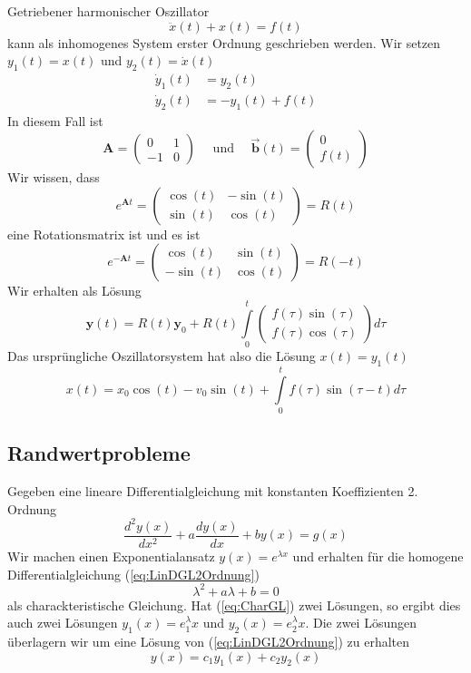    \begin{example}{Getriebener harmonischer Oszillator}
     \[\ddot{x}(t)+x(t)=f(t)\]
     kann als inhomogenes System erster Ordnung geschrieben werden. Wir setzen
     $y_1(t)=x(t)$ und $y_2(t)=\dot{x}(t)$
     \begin{align*}
       \dot{y}_1(t)&=y_2(t)\\
       \dot{y}_2(t)&=-y_1(t)+f(t)
     \end{align*}
     In diesem Fall ist
     \[\mathbf{A}=
       \begin{pmatrix}
	 0&1\\ -1&0
       \end{pmatrix}\quad
       \mbox{ und }\quad
       \vec{\mathbf{b}}(t)=\begin{pmatrix}0\\ f(t)\end{pmatrix}
     \]
     Wir wissen, dass
     \[e^{\mathbf{A}t}=
       \begin{pmatrix}
	 \cos(t)&-\sin(t)\\ \sin(t)&\cos(t)
       \end{pmatrix}
       =R(t)
     \]
     eine Rotationsmatrix ist und es ist
     \[e^{-\mathbf{A}t}=
       \begin{pmatrix}
         \cos(t)&\sin(t)\\-\sin(t)&\cos(t)
       \end{pmatrix}
       =R(-t)
     \]
     Wir erhalten als Lösung
     \[\mathbf{y}(t)=R(t)\mathbf{y}_0 + 
       R(t)\int\limits_0^t\begin{pmatrix}f(\tau)\sin(\tau)\\f(\tau)\cos(\tau)\end{pmatrix}d\tau
     \]
     Das ursprüngliche Oszillatorsystem hat also die Lösung $x(t)=y_1(t)$
     \[ x(t)=x_0\cos(t)-v_0\sin(t)+\int\limits_0^tf(\tau)\sin(\tau -t)d\tau \]
   \end{example}
\subsection{Randwertprobleme}
Gegeben eine lineare Differentialgleichung mit konstanten Koeffizienten 2. Ordnung
\begin{equation}
    \frac{d^2y(x)}{dx^2}+a\frac{dy(x)}{dx}+by(x)=g(x)
    \label{eq:LinDGL2Ordnung}
\end{equation}
Wir machen einen Exponentialansatz $y(x)=e^{\lambda x}$ und erhalten für die homogene Differentialgleichung (\ref{eq:LinDGL2Ordnung})
\begin{equation}
    \lambda^2+a\lambda+b=0
    \label{eq:CharGL}
\end{equation}
als charackteristische Gleichung. Hat (\ref{eq:CharGL}) zwei Lösungen, so ergibt dies auch zwei Lösungen $y_1(x)=e^\lambda_1 x$ und $y_2(x)=e^\lambda_2x$. Die zwei Lösungen überlagern wir um eine Lösung von (\ref{eq:LinDGL2Ordnung}) zu erhalten
\[ y(x)=c_1 y_1(x)+c_2 y_2(x) \]

